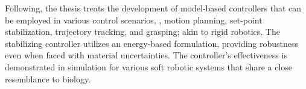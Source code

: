 
Following, the thesis treats the development of model-based controllers that can be employed in various control scenarios, \eg, motion planning, set-point stabilization, trajectory tracking, and grasping; akin to rigid robotics. The stabilizing controller utilizes an energy-based formulation, providing robustness even when faced with material uncertainties. The controller's effectiveness is demonstrated in simulation for various soft robotic systems that share a close resemblance to biology.



